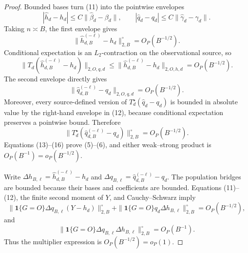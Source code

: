\documentclass{article}
\begin{document}
\begin{proof}
Bounded bases turn (11) into the pointwise envelopes
\[
 |\widehat h_d-h_d|\le C\|\widehat\beta_d-\beta_d\|,
 \qquad
 |\widehat q_d-q_d|\le C\|\widehat\gamma_d-\gamma_d\|.    \tag{12}
\]
Taking \(n\asymp B\), the first envelope gives
\[
 \|\widehat h_{d,B}^{(-\ell)}-h_d\|_{2,B}^{\circ}
 =O_P(B^{-1/2}).                                               \tag{13}
\]
Conditional expectation is an \(L_2\)-contraction on the observational source, so
\[
 \|T_d(\widehat h_{d,B}^{(-\ell)}-h_d)\|_{2,O,q,d}
 \le \|\widehat h_{d,B}^{(-\ell)}-h_d\|_{2,O,h,d}
 =O_P(B^{-1/2}).                                               \tag{14}
\]
The second envelope directly gives
\[
 \|\widehat q_{d,B}^{(-\ell)}-q_d\|_{2,O,q,d}
 =O_P(B^{-1/2}).                                               \tag{15}
\]
Moreover, every source-defined version of \(T_d^\star(\widehat q_d-q_d)\) is bounded in absolute value by the right-hand envelope in (12), because conditional expectation preserves a pointwise bound.  Therefore
\[
 \|T_d^\star(\widehat q_{d,B}^{(-\ell)}-q_d)\|_{2,B}^{\circ}
 =O_P(B^{-1/2}).                                               \tag{16}
\]
Equations (13)--(16) prove (5)--(6), and either weak--strong product is \(O_P(B^{-1})=o_P(B^{-1/2})\).

Write \(\Delta h_{B,\ell}=\widehat h_{d,B}^{(-\ell)}-h_d\) and \(\Delta q_{B,\ell}=\widehat q_{d,B}^{(-\ell)}-q_d\).  The population bridges are bounded because their bases and coefficients are bounded.  Equations (11)--(12), the finite second moment of \(Y\), and Cauchy--Schwarz imply
\[
 \|\mathbf1\{G=O\}\Delta q_{B,\ell}(Y-h_d)\|_{2,B}^{\circ}
 +\|\mathbf1\{G=O\}q_d\Delta h_{B,\ell}\|_{2,B}^{\circ}
 =O_P(B^{-1/2}),                                               \tag{17}
\]
and
\[
 \|\mathbf1\{G=O\}\Delta q_{B,\ell}\Delta h_{B,\ell}\|_{2,B}^{\circ}
 =O_P(B^{-1}).                                                 \tag{18}
\]
Thus the multiplier expression is \(O_P(B^{-1/2})=o_P(1)\).


\end{proof}
\end{document}
